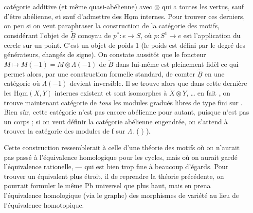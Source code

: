 \documentclass[11pt,a4paper]{article}
\begin{document}
catégorie additive (et même quasi-abélienne) avec $\otimes$ qui a toutes les
vertus, sauf d'être abélienne, et sauf d'admettre des
$\underline{\mathrm{Hom}}$ internes.
Pour trouver ces derniers, on peu si on veut paraphraser la
construction de la catégorie des motifs,  considérant l'objet
 de $\widetilde{\underline{B}}$ conoyau de
$p^{*} : e \to S$, où $p : S^{1} \to e$ est l'application du cercle sur un
point. C'est un objet de poids 1 (le poids est défini par le degré des
générateurs, changés de signe). On constate aussitôt que le foncteur
$M \mapsto M(-1) = M \otimes \Lambda(-1)$ de $\widetilde{\underline{B}}$ dans
lui-même est pleinement fidèl ce qui permet alors, par une construction
formelle standard, de comter $\widetilde{\underline{B}}$ en une
catégorie où $\Lambda(-1)$ devient inversible. Il se trouve alors que dans
cette dernière les $\underline{\mathrm{Hom}}(X, Y)$ internes existent et sont
isomorphes à $\check{X} \otimes Y$, … en fait , on trouve maintenant 
catégorie de \emph{tous} les modules gradués libres de type fini sur
\add{$\Lambda$}. Bien sûr, cette catégorie n'est pas encore abélienne pour
autant, puisque \add{$\Lambda$} n'est pas un corps ; si on veut définir la
catégorie abélienne engendrée, on s'attend à trouver la catégorie des modules
de   f sur $\Lambda$. ( )
).

Cette construction ressemblerait à celle d'une théorie des motifs où on
n'aurait pas passé à l'équivalence homologique pour les cycles, mais où on
aurait gardé l'équivalence rationelle, --- qui est bien trop fine à beaucoup
d'égards. Pour trouver un équivalent plus étroit, il  de
reprendre la théorie précédente, on pourrait formuler le même Pb universel que
plus haut, mais en prena l'équivalence homologique (via le graphe) des
morphismes de variété au lieu de l'équivalence homotopique.
\end{document}
